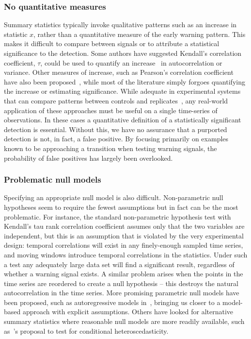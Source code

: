 \documentclass[authoryear,review,11pt]{elsarticle}
\begin{document}
\subsubsection*{No quantitative measures}
Summary statistics typically invoke qualitative patterns such as an increase in statistic $x$,
rather than a quantitative measure of the early warning pattern.
This makes it difficult to compare between signals or to
attribute a statistical significance to the detection.
Some authors have suggested Kendall's correlation coefficient,
$\tau$, could be used to quantify an increase~\citep{Dakos2008, Dakos2011}
in autocorrelation or variance.
Other measures of increase, such as Pearson's correlation coefficient have also been proposed~\citep{Drake2010},
while most of the literature simply forgoes quantifying the increase or estimating significance.
While adequate in experimental systems that can compare patterns between controls 
and replicates~\citep[\emph{e.g.}][]{Drake2010, Carpenter2011}, 
any real-world application of these approaches must be useful on a single time-series of observations.
In these cases a quantitative definition of a statistically significant detection is essential.
Without this, we have no assurance that a purported detection is not, in fact, a false positive. 
By focusing primarily on examples known to be approaching a transition when testing warning signals,
the probability of false positives has largely been overlooked.  

\subsubsection*{Problematic null models}
Specifying an appropriate null model is also difficult.
Non-parametric null hypotheses seem to require the fewest assumptions but in fact can be the most problematic.
For instance, the standard non-parametric hypothesis test with Kendall's tau rank correlation coefficient
assumes only that the two variables are independent,
but this is an assumption that is violated by the very experimental design:
temporal correlations will exist in any finely-enough sampled time series,
and moving windows introduce temporal correlations in the statistics.
Under such a test any adequately large data set will find a significant result,
regardless of whether a warning signal exists.
A similar problem arises when the points in the time series are reordered to create a null hypothesis --
this destroys the natural autocorrelation in the time series.
More promising parametric null models have been proposed,
such as autoregressive models in~\citet{Dakos2008}, bringing us
closer to a model-based approach with explicit assumptions.
Others have looked for alternative summary statistics where
reasonable null models are more readily available,
such as~\citet{Seekell2011}'s proposal to test for conditional heteroscedasticity.
\end{document}
